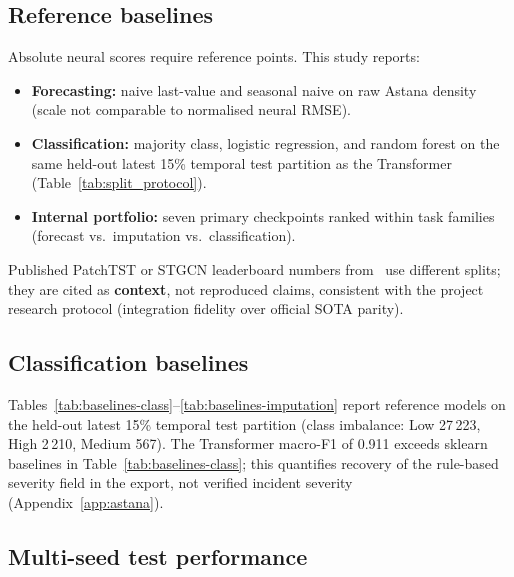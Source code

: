 \subsection{Reference baselines}

Absolute neural scores require reference points. This study reports:
\begin{itemize}
  \item \textbf{Forecasting:} naive last-value and seasonal naive on raw Astana density (scale not comparable to normalised neural RMSE).
  \item \textbf{Classification:} majority class, logistic regression, and random forest on the same held-out latest 15\% temporal test partition as the Transformer (Table~\ref{tab:split_protocol}).
  \item \textbf{Internal portfolio:} seven primary checkpoints ranked within task families (forecast vs.\ imputation vs.\ classification).
\end{itemize}
Published PatchTST or STGCN leaderboard numbers from~\cite{nie2023patchtst,yu2018stgcn} use different splits; they are cited as \textbf{context}, not reproduced claims, consistent with the project research protocol (integration fidelity over official SOTA parity).

\subsection{Classification baselines}

Tables~\ref{tab:baselines-class}--\ref{tab:baselines-imputation} report reference models on the held-out latest 15\% temporal test partition (class imbalance: Low 27\,223, High 2\,210, Medium 567). The Transformer macro-F1 of 0.911 exceeds sklearn baselines in Table~\ref{tab:baselines-class}; this quantifies recovery of the rule-based severity field in the export, not verified incident severity (Appendix~\ref{app:astana}).



\subsection{Multi-seed test performance}

